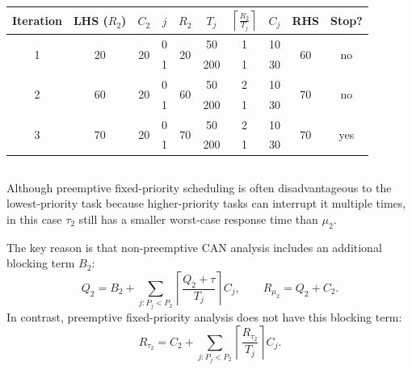\documentclass{article}
\begin{document}
\subsection{}
\begin{table}[H]
    \centering
    \renewcommand{\arraystretch}{1.3}
    \begin{tabular}{|c||c||c|c|c|c|c|c|c|c|}
        \hline
        Iteration & LHS ($R_2$) & $C_2$ & $j$ & $R_2$ & $T_j$ & $\left\lceil \frac{R_2}{T_j} \right\rceil$ & $C_j$ & RHS & Stop? \\
        \hline \hline
                \multirow{2}{*}{1} & \multirow{2}{*}{20} & \multirow{2}{*}{20} & 0 & \multirow{2}{*}{20} & 50  & 1 & 10 & \multirow{2}{*}{60} & \multirow{2}{*}{no} \\
                \cline{4-4}\cline{6-8}
                    &  &  & 1 &  & 200 & 1 & 30 &  &  \\
                \hline
                \multirow{2}{*}{2} & \multirow{2}{*}{60} & \multirow{2}{*}{20} & 0 & \multirow{2}{*}{60} & 50 & 2 & 10 & \multirow{2}{*}{70} & \multirow{2}{*}{no} \\
                \cline{4-4}\cline{6-8}
                    &  &  & 1 &  & 200 & 1 & 30 &  &  \\
                \hline
                \multirow{2}{*}{3} & \multirow{2}{*}{70} & \multirow{2}{*}{20} & 0 & \multirow{2}{*}{70} & 50 & 2 & 10 & \multirow{2}{*}{70} & \multirow{2}{*}{yes} \\
                \cline{4-4}\cline{6-8}
                    &  &  & 1 &  & 200 & 1 & 30 &  &  \\
        \hline
    \end{tabular}
\end{table}
\subsection{}
Although preemptive fixed-priority scheduling is often disadvantageous to the lowest-priority task because higher-priority tasks can interrupt it multiple times, in this case $\tau_2$ still has a smaller worst-case response time than $\mu_2$.

The key reason is that non-preemptive CAN analysis includes an additional blocking term $B_2$:
\[
Q_2 = B_2 + \sum_{j:P_j<P_2}\left\lceil \frac{Q_2+\tau}{T_j} \right\rceil C_j,
\qquad
R_{\mu_2}=Q_2+C_2.
\]
In contrast, preemptive fixed-priority analysis does not have this blocking term:
\[
R_{\tau_2}=C_2+\sum_{j:P_j<P_2}\left\lceil \frac{R_{\tau_2}}{T_j} \right\rceil C_j.
\]
\end{document}
